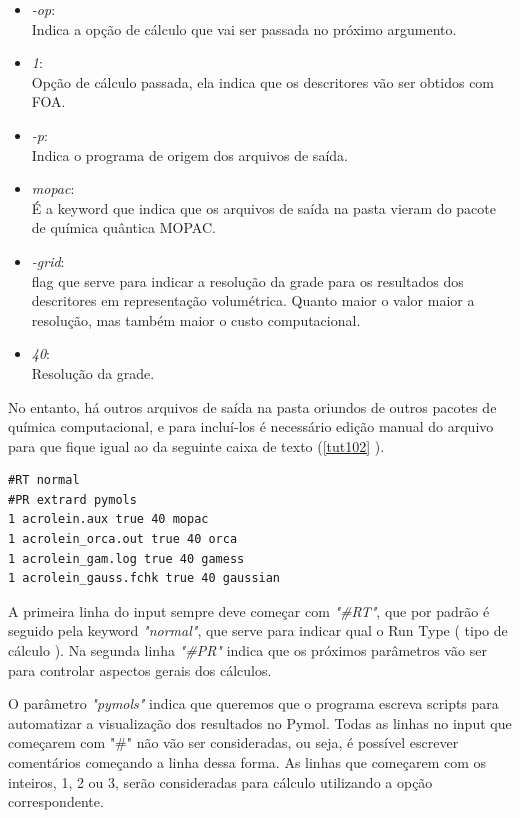 \documentclass[a4paper,11pt]{refart}
\begin{document}
\begin{itemize}
	\item \emph{-op}:\\ Indica a opção de cálculo que vai ser passada no próximo argumento.
	\item \emph{1}: \\ Opção de cálculo passada, ela indica que os descritores vão ser obtidos com FOA.
	\item \emph{-p}: \\Indica o programa de origem dos arquivos de saída.
	\item \emph{mopac}: \\É a keyword que indica que os arquivos de saída na pasta vieram do pacote de química quântica MOPAC.
	\item \emph{-grid}: \\ flag que serve para indicar a resolução da grade para os resultados dos descritores em representação volumétrica. Quanto maior o valor maior a resolução, mas também maior o custo computacional.
	\item \emph{40}: \\ Resolução da grade.
\end{itemize}

No entanto, há outros arquivos de saída na pasta oriundos de outros pacotes de química computacional, e para incluí-los é necessário edição manual do arquivo para que fique igual ao da seguinte caixa de texto (\autoref{tut102} ).

\begin{minipage}{\textwidth}
\begin{lstlisting}[caption={Input editado para execução do tutorial.},label={tut102}]
#RT normal 
#PR extrard pymols
1 acrolein.aux true 40 mopac 
1 acrolein_orca.out true 40 orca 
1 acrolein_gam.log true 40 gamess
1 acrolein_gauss.fchk true 40 gaussian 
\end{lstlisting}
\end{minipage}

A primeira linha do input sempre deve começar com \emph{"\#RT"}, que por padrão é seguido pela keyword \emph{"normal"}, que serve para indicar qual o Run Type ( tipo de cálculo ). Na segunda linha \emph{"\#PR"} indica que os próximos parâmetros vão ser para controlar aspectos gerais dos cálculos.

O parâmetro \emph{"pymols"} indica que queremos que o programa escreva scripts para automatizar a visualização dos resultados no Pymol. Todas as linhas no input que começarem com "\#" não vão ser consideradas, ou seja, é possível escrever comentários começando a linha dessa forma. As linhas que começarem com os inteiros, 1, 2 ou 3, serão consideradas para cálculo utilizando a opção correspondente.
\end{document}
